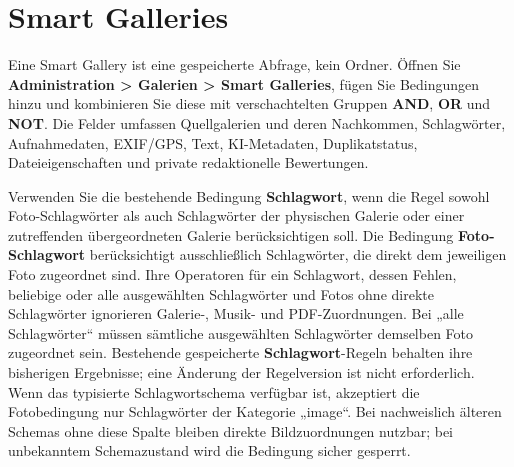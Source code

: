 \documentclass[11pt,a4paper]{article}
\newcommand{\ui}[1]{\textbf{#1}}
\begin{document}
\section{Smart Galleries}

Eine Smart Gallery ist eine gespeicherte Abfrage, kein Ordner. Öffnen Sie
\ui{Administration > Galerien > Smart Galleries}, fügen Sie Bedingungen hinzu
und kombinieren Sie diese mit verschachtelten Gruppen \ui{AND}, \ui{OR} und
\ui{NOT}. Die Felder umfassen Quellgalerien und deren Nachkommen, Schlagwörter,
Aufnahmedaten, EXIF/GPS, Text, KI-Metadaten, Duplikatstatus, Dateieigenschaften
und private redaktionelle Bewertungen.

Verwenden Sie die bestehende Bedingung \ui{Schlagwort}, wenn die Regel sowohl
Foto-Schlagwörter als auch Schlagwörter der physischen Galerie oder einer
zutreffenden übergeordneten Galerie berücksichtigen soll. Die Bedingung
\ui{Foto-Schlagwort} berücksichtigt ausschließlich Schlagwörter, die direkt dem
jeweiligen Foto zugeordnet sind. Ihre Operatoren für ein Schlagwort, dessen
Fehlen, beliebige oder alle ausgewählten Schlagwörter und Fotos ohne direkte
Schlagwörter ignorieren Galerie-, Musik- und PDF-Zuordnungen. Bei „alle
Schlagwörter“ müssen sämtliche ausgewählten Schlagwörter demselben Foto
zugeordnet sein. Bestehende gespeicherte \ui{Schlagwort}-Regeln behalten ihre
bisherigen Ergebnisse; eine Änderung der Regelversion ist nicht erforderlich.
Wenn das typisierte Schlagwortschema verfügbar ist, akzeptiert die Fotobedingung
nur Schlagwörter der Kategorie „image“. Bei nachweislich älteren Schemas ohne
diese Spalte bleiben direkte Bildzuordnungen nutzbar; bei unbekanntem
Schemazustand wird die Bedingung sicher gesperrt.
\end{document}
